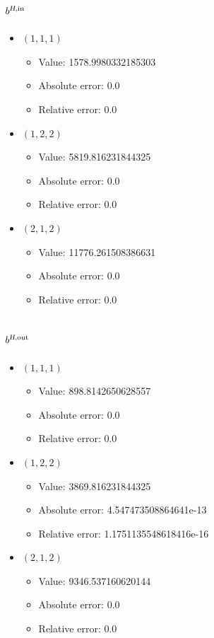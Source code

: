 \documentclass{article}%
\begin{document}
\subsection{$b^{\textsl{H},\text{in}}$}%
\begin{itemize}%
	\item $(1, 1, 1)$%
	\begin{itemize}%
		\item Value: 1578.9980332185303%
		\item Absolute error: 0.0%
		\item Relative error: 0.0%
	\end{itemize}%
	\item $(1, 2, 2)$%
	\begin{itemize}%
		\item Value: 5819.816231844325%
		\item Absolute error: 0.0%
		\item Relative error: 0.0%
	\end{itemize}%
	\item $(2, 1, 2)$%
	\begin{itemize}%
		\item Value: 11776.261508386631%
		\item Absolute error: 0.0%
		\item Relative error: 0.0%
	\end{itemize}%
\end{itemize}%
\subsection{$b^{\textsl{H},\text{out}}$}%
\begin{itemize}%
	\item $(1, 1, 1)$%
	\begin{itemize}%
		\item Value: 898.8142650628557%
		\item Absolute error: 0.0%
		\item Relative error: 0.0%
	\end{itemize}%
	\item $(1, 2, 2)$%
	\begin{itemize}%
		\item Value: 3869.816231844325%
		\item Absolute error: 4.547473508864641e-13%
		\item Relative error: 1.1751135548618416e-16%
	\end{itemize}%
	\item $(2, 1, 2)$%
	\begin{itemize}%
		\item Value: 9346.537160620144%
		\item Absolute error: 0.0%
		\item Relative error: 0.0%
	\end{itemize}%
\end{itemize}%
\end{document}
